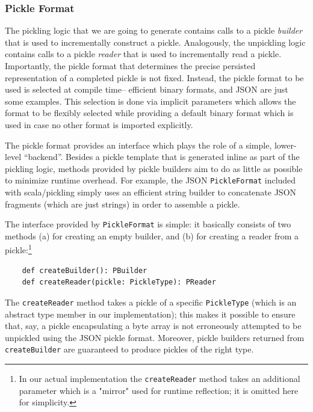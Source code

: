 \documentclass[preprint,10pt]{sigplanconf}
\theoremstyle{definition}
\theoremstyle{definition}
\newcommand{\term}[1]{\mbox{\texttt{#1}}}
\begin{document}
\subsubsection{Pickle Format}
\label{sec:pickleformat}

The pickling logic that we are going to generate contains calls to a pickle
{\em builder} that is used to incrementally construct a pickle. Analogously,
the unpickling logic contains calls to a pickle {\em reader} that is used to
incrementally read a pickle. Importantly, the pickle format that determines
the precise persisted representation of a completed pickle is not fixed.
Instead, the pickle format to be used is selected at compile time-- efficient
binary formats, and JSON are just some examples. This selection is done via
implicit parameters which allows the format to be flexibly selected while
providing a default binary format which is used in case no other format is
imported explicitly.

The pickle format provides an interface which plays the role of a simple,
lower-level ``backend''. Besides a pickle template that is generated inline as
part of the pickling logic, methods provided by pickle builders aim to do as
little as possible to minimize runtime overhead. For example,  the JSON
\term{PickleFormat} included with scala/pickling simply uses an
efficient string builder to concatenate JSON fragments (which are just
strings) in order to assemble a pickle.

The interface provided by \term{PickleFormat} is simple: it basically consists
of two methods (a) for creating an empty builder, and (b) for creating a
reader from a pickle:\footnote{In our actual implementation the
\term{createReader} method takes an additional parameter which is a "mirror"
used for runtime reflection; it is omitted here for simplicity.}

\begin{lstlisting}
    def createBuilder(): PBuilder
    def createReader(pickle: PickleType): PReader
\end{lstlisting}

The \term{createReader} method takes a pickle of a specific \term{PickleType}
(which is an abstract type member in our implementation); this makes it
possible to ensure that, say, a pickle encapsulating a byte array is not
erroneously attempted to be unpickled using the JSON pickle format. Moreover,
pickle builders returned from \verb|createBuilder| are guaranteed to produce
pickles of the right type.
\end{document}
